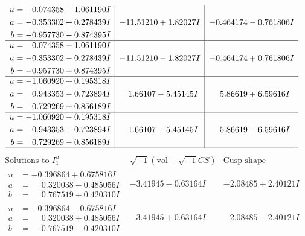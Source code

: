 \documentclass[1p]{elsarticle_modified}
\theoremstyle{definition}
\newcommand{\I}{\sqrt{-1}}
\begin{document}
$$\begin{array}{c|c|c}
\begin{aligned}
u &= \phantom{-}0.074358 + 1.061190 I \\
a &= -0.353302 + 0.278439 I \\
b &= -0.957730 - 0.874395 I\end{aligned}
 & -11.51210 + 1.82027 I & -0.464174 - 0.761806 I \\ \hline\begin{aligned}
u &= \phantom{-}0.074358 - 1.061190 I \\
a &= -0.353302 - 0.278439 I \\
b &= -0.957730 + 0.874395 I\end{aligned}
 & -11.51210 - 1.82027 I & -0.464174 + 0.761806 I \\ \hline\begin{aligned}
u &= -1.060920 + 0.195318 I \\
a &= \phantom{-}0.943353 - 0.723894 I \\
b &= \phantom{-}0.729269 + 0.856189 I\end{aligned}
 & \phantom{-}1.66107 - 5.45145 I & \phantom{-}5.86619 + 6.59616 I \\ \hline\begin{aligned}
u &= -1.060920 - 0.195318 I \\
a &= \phantom{-}0.943353 + 0.723894 I \\
b &= \phantom{-}0.729269 - 0.856189 I\end{aligned}
 & \phantom{-}1.66107 + 5.45145 I & \phantom{-}5.86619 - 6.59616 I\\
 \hline 
 \end{array}$$\newpage$$\begin{array}{c|c|c}  
\text{Solutions to }I^u_{1}& \I (\text{vol} + \sqrt{-1}CS) & \text{Cusp shape}\\
 \hline 
\begin{aligned}
u &= -0.396864 + 0.675816 I \\
a &= \phantom{-}0.320038 - 0.485056 I \\
b &= \phantom{-}0.767519 + 0.420310 I\end{aligned}
 & -3.41945 - 0.63164 I & -2.08485 + 2.40121 I \\ \hline\begin{aligned}
u &= -0.396864 - 0.675816 I \\
a &= \phantom{-}0.320038 + 0.485056 I \\
b &= \phantom{-}0.767519 - 0.420310 I\end{aligned}
 & -3.41945 + 0.63164 I & -2.08485 - 2.40121 I \\ \hline\begin{aligned}

\end{aligned}
\end{array}$$
\end{document}
